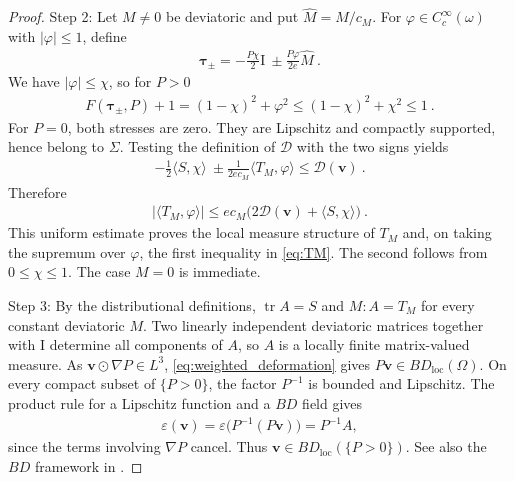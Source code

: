 \documentclass{article}
\theoremstyle{definition}
\newcommand{\bfv}{\boldsymbol{v}}
\newcommand{\bftau}{\boldsymbol{\tau}}
\newcommand{\bfI}{\boldsymbol{\mathrm{I}}}
\newcommand{\D}{\mathcal{D}}
\DeclareMathOperator{\tr}{tr}
\begin{document}
\begin{proof}
    Step 2: Let $M\ne0$ be deviatoric and put $\widehat M=M/c_M$. For
    $\varphi\in C_c^\infty(\omega)$ with $|\varphi|\leq1$, define
    \begin{align*}
        \bftau_\pm=-\frac{P\chi}{2}\bfI
                    \ \pm\frac{P\varphi}{2e}\widehat M \ .
    \end{align*}
    We have $|\varphi|\leq\chi$, so for $P>0$
    \begin{align*}
        F(\bftau_\pm,P)+1=(1-\chi)^2+\varphi^2
        \leq(1-\chi)^2+\chi^2\leq1 \ .
    \end{align*}
    For $P=0$, both stresses are zero. They are Lipschitz and compactly
    supported, hence belong to $\Sigma$. Testing the definition of $\D$
    with the two signs yields
    \begin{align*}
        -\frac{1}{2}\langle S,\chi\rangle
        \ \pm\frac{1}{2e c_M}\langle T_M,\varphi\rangle
        \leq\D(\bfv) \ .
    \end{align*}
    Therefore
    \begin{align*}
        |\langle T_M,\varphi\rangle|
        \leq e c_M\bigl(2\D(\bfv)+\langle S,\chi\rangle\bigr) \ .
    \end{align*}
    This uniform estimate proves the local measure structure of $T_M$ and,
    on taking the supremum over $\varphi$, the first inequality in
    \eqref{eq:TM}. The second follows from $0\leq\chi\leq1$.
    The case $M=0$ is immediate.

    Step 3: By the distributional definitions, $\tr A=S$ and $M:A=T_M$
    for every constant deviatoric $M$. Two linearly independent deviatoric
    matrices together with $\bfI$ determine all components of $A$, so
    $A$ is a locally finite matrix-valued measure. As
    $\bfv\odot\nabla P\in L^3$, \eqref{eq:weighted_deformation} gives
    $P\bfv\in BD_{\mathrm{loc}}(\Omega)$. On every compact subset of
    $\{P>0\}$, the factor $P^{-1}$ is bounded and Lipschitz. The product
    rule for a Lipschitz function and a $BD$ field gives
    \begin{align*}
        \varepsilon(\bfv)
        =\varepsilon\bigl(P^{-1}(P\bfv)\bigr)=P^{-1}A,
    \end{align*}
    since the terms involving $\nabla P$ cancel. Thus
    $\bfv\in BD_{\mathrm{loc}}(\{P>0\})$. See also the $BD$ framework
    in \cite{RG80,KT83}.
\end{proof}
\end{document}
